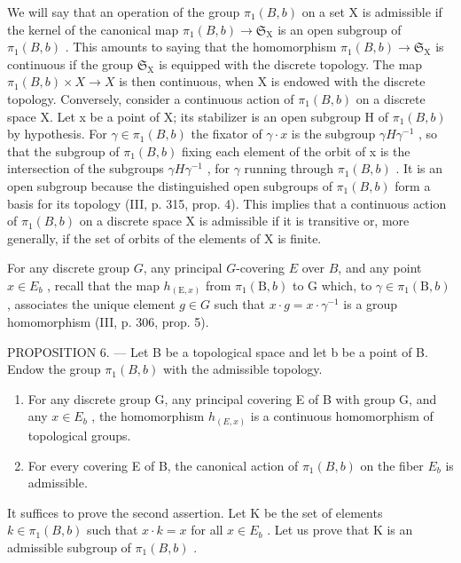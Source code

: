 We will say that an operation of the group \(\pi_1(B, b)\) on a set X is admissible if the kernel of the canonical map \(\pi_1(B, b) \to \mathfrak{S}_{\mathrm{X}}\) is an open subgroup of \(\pi_1(B, b)\) . This amounts to saying that the homomorphism \(\pi_1(B, b) \to \mathfrak{S}_{\mathrm{X}}\) is continuous if the group \(\mathfrak{S}_{\mathrm{X}}\) is equipped with the discrete topology. The map \(\pi_1(B, b) \times X \to X\) is then continuous, when X is endowed with the discrete topology. Conversely, consider a continuous action of \(\pi_{1}(B,b)\) on a discrete space X. Let x be a point of X; its stabilizer is an open subgroup H of \(\pi_{1}(B,b)\) by hypothesis. For \(\gamma\in\pi_{1}(B,b)\) the fixator of \(\gamma\cdot x\) is the subgroup \(\gamma H\gamma^{-1}\) , so that the subgroup of \(\pi_{1}(B,b)\) fixing each element of the orbit of x is the intersection of the subgroups \(\gamma H\gamma^{-1}\) , for \(\gamma\) running through \(\pi_{1}(B,b)\) . It is an open subgroup because the distinguished open subgroups of \(\pi_{1}(B,b)\) form a basis for its topology (III, p. 315, prop. 4). This implies that a continuous action of \(\pi_{1}(B,b)\) on a discrete space X is admissible if it is transitive or, more generally, if the set of orbits of the elements of X is finite.

For any discrete group \(G\), any principal \(G\)-covering \(E\) over \(B\), and any point \(x \in E_{b}\) , recall that the map \(h_{(\mathrm{E},x)}\) from \(\pi_{1}(\mathrm{B},b)\) to G which, to \(\gamma \in \pi_{1}(\mathrm{B},b)\) , associates the unique element \(g \in G\) such that \(x \cdot g = x \cdot \gamma^{-1}\) is a group homomorphism (III, p. 306, prop. 5).

PROPOSITION 6. --- Let B be a topological space and let b be a point of B. Endow the group \(\pi_1(B, b)\) with the admissible topology.

\begin{enumerate}
\def\labelenumi{\alph{enumi})}
\item
  For any discrete group G, any principal covering E of B with group G, and any \(x \in E_{b}\) , the homomorphism \(h_{(E,x)}\) is a continuous homomorphism of topological groups.
\item
  For every covering E of B, the canonical action of \(\pi_{1}(B,b)\) on the fiber \(E_{b}\) is admissible.
\end{enumerate}

It suffices to prove the second assertion. Let K be the set of elements \(k \in \pi_{1}(B, b)\) such that \(x \cdot k = x\) for all \(x \in E_{b}\) . Let us prove that K is an admissible subgroup of \(\pi_{1}(B, b)\) .

